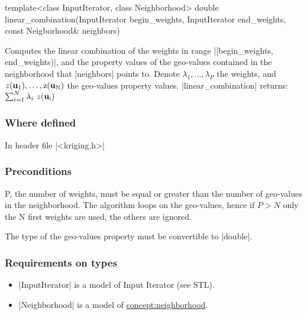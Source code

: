 \documentclass[12pt,twoside]{report}
\newcommand{\mloc}[1]{\rm{\bf #1}}
\begin{document}
\begin{code}
template<class InputIterator, class Neighborhood>
double
linear_combination(InputIterator begin_weights, InputIterator end_weights,
                   const Neigborhood& neighbors) 

\end{code}



Computes the linear combination of the weights in range |[begin_weights, end_weights)|, and the property values of the geo-values contained in the neighborhood that |neighbors| points to. Denote $\lambda_1,\ldots,\lambda_P$ the weights, and $z(\mloc{u}_1),\ldots,z(\mloc{u}_N)$ the geo-values property values. |linear_combination| returns: $\sum_{i=1}^N \lambda_i \ z(\mloc{u}_i)$



\htmlrule[CLEAR=all]  \subsubsection*{Where defined}
In header file |<kriging.h>|


\htmlrule[CLEAR=all]  \subsubsection*{Preconditions}
P, the number of weights, must be equal or greater than the number of geo-values in the neighborhood.
The algorithm loops on the geo-values, hence if $P>N$ only the N first weights are used, the others are ignored.

The type of the geo-values property must be convertible to |double|.


\htmlrule[CLEAR=all]  \subsubsection*{Requirements on types}
\begin{itemize}
\item |InputIterator| is a model of Input Iterator (see STL).
\item |Neighborhood| is a model of \hyperref{Neighborhood}{Neighborhood (see Section}{)}{concept:neighborhood}. 
\end{itemize}


 
\end{document}
